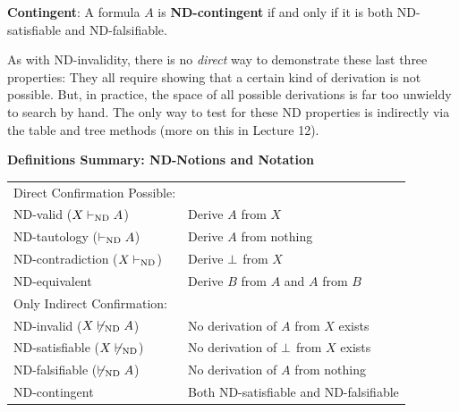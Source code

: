 \documentclass[options]{philosophersimprint}
\begin{document}
\textbf{Contingent}: A formula $A$ is \textbf{ND-contingent} if and only if it is both ND-satisfiable and ND-falsifiable.

As with ND-invalidity, there is no \textit{direct} way to demonstrate these last three properties: They all require showing that a certain kind of derivation is not possible. But, in practice, the space of all possible derivations is far too unwieldy to search by hand. The only way to test for these ND properties is indirectly via the table and tree methods (more on this in Lecture 12).

\begin{framed}
\noindent\textbf{Definitions Summary: ND-Notions and Notation}\\[-12pt]
\setlength{\tabcolsep}{5pt}
\begin{tabular}{@{}l | l@{}}
Direct Confirmation Possible:& \\
ND-valid ($X\vdash_{\mathrm{ND}} A$) & Derive $A$ from $X$\\
ND-tautology ($\vdash_{\mathrm{ND}} A$) & Derive $A$ from nothing\\
ND-contradiction ($X\vdash_{\mathrm{ND}}$) & Derive $\bot$ from $X$\\
ND-equivalent & Derive $B$ from $A$ and $A$ from $B$\\
\hline
Only Indirect Confirmation:& \\
ND-invalid ($X\not\vdash_{\mathrm{ND}} A$) & No derivation of $A$ from $X$ exists\\
ND-satisfiable ($X\not\vdash_{\mathrm{ND}}$) & No derivation of $\bot$ from $X$ exists\\
ND-falsifiable ($\not\vdash_{\mathrm{ND}} A$) & No derivation of $A$ from nothing\\
ND-contingent & Both ND-satisfiable and ND-falsifiable\\
\end{tabular}
\vspace{-0.25cm}
\end{framed}
\end{document}
